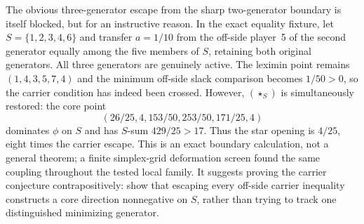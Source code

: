 The obvious three-generator escape from the sharp two-generator boundary is
itself blocked, but for an instructive reason.  In the exact equality fixture,
let $S=\{1,2,3,4,6\}$ and transfer $a=1/10$ from the off-side player~5 of the
second generator equally among the five members of $S$, retaining both original
generators.  All three generators are genuinely active.  The leximin point
remains $(1,4,3,5,7,4)$ and the minimum off-side slack comparison becomes
$1/50>0$, so the carrier condition has indeed been crossed.  However,
$(\star_S)$ is simultaneously restored: the core point
\[
 (26/25,4,153/50,253/50,171/25,4)
\]
dominates $\phi$ on $S$ and has $S$-sum $429/25>17$.  Thus the star opening is
$4/25$, eight times the carrier escape.  This is an exact boundary calculation,
not a general theorem; a finite simplex-grid deformation screen found the same
coupling throughout the tested local family.  It suggests proving the carrier
conjecture contrapositively: show that escaping every off-side carrier inequality
constructs a core direction nonnegative on $S$, rather than trying to track one
distinguished minimizing generator.

